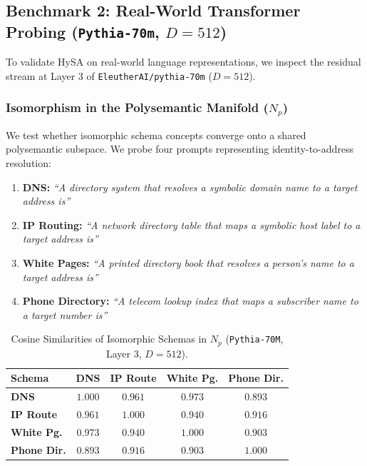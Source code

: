 \documentclass[10pt,twocolumn]{article}
\theoremstyle{definition}
\begin{document}
\subsection{Benchmark 2: Real-World Transformer Probing (\texorpdfstring{\texttt{Pythia-70m}}{Pythia-70m}, \texorpdfstring{$D=512$}{D=512})}
To validate HySA on real-world language representations, we inspect the residual stream at Layer 3 of \texttt{EleutherAI/pythia-70m} ($D=512$).

\subsubsection{Isomorphism in the Polysemantic Manifold \texorpdfstring{($N_p$)}{(Np)}}
We test whether isomorphic schema concepts converge onto a shared polysemantic subspace. We probe four prompts representing identity-to-address resolution:
\begin{enumerate}[leftmargin=*, itemsep=1.0pt]
    \item \textbf{DNS:} \textit{``A directory system that resolves a symbolic domain name to a target address is''}
    \item \textbf{IP Routing:} \textit{``A network directory table that maps a symbolic host label to a target address is''}
    \item \textbf{White Pages:} \textit{``A printed directory book that resolves a person's name to a target address is''}
    \item \textbf{Phone Directory:} \textit{``A telecom lookup index that maps a subscriber name to a target number is''}
\end{enumerate}

\begin{table}[t]
\centering
\caption{Cosine Similarities of Isomorphic Schemas in $N_p$ (\texttt{Pythia-70M}, Layer 3, $D=512$).}
\label{tab:pythia_cosine}
\vspace{0.12cm}
\scriptsize
\setlength{\tabcolsep}{2.5pt}
\begin{tabular}{@{}lcccc@{}}
\toprule
\textbf{Schema} & \textbf{DNS} & \textbf{IP Route} & \textbf{White Pg.} & \textbf{Phone Dir.} \\ \midrule
\textbf{DNS} & $1.000$ & $0.961$ & $0.973$ & $0.893$ \\
\textbf{IP Route} & $0.961$ & $1.000$ & $0.940$ & $0.916$ \\
\textbf{White Pg.} & $0.973$ & $0.940$ & $1.000$ & $0.903$ \\
\textbf{Phone Dir.} & $0.893$ & $0.916$ & $0.903$ & $1.000$ \\ \bottomrule
\end{tabular}
\end{table}
\end{document}

